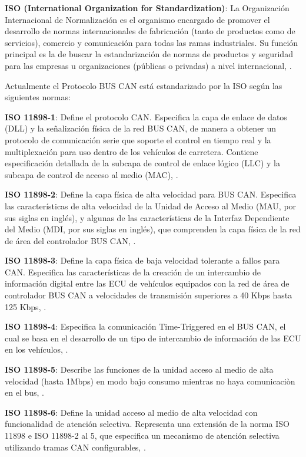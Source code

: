 \textbf{ISO (International Organization for Standardization)}:  La Organización Internacional de Normalización es el organismo encargado de promover el desarrollo de normas internacionales de fabricación (tanto de productos como de servicios), comercio y comunicación para todas las ramas industriales. Su función principal es la de buscar la estandarización de normas de productos y seguridad para las empresas u organizaciones (públicas o privadas) a nivel internacional, \cite{ISO}.

Actualmente el Protocolo BUS CAN está estandarizado por la ISO según las siguientes normas:

\textbf{ISO 11898-1}: Define el protocolo CAN. Especifica la capa de enlace de datos (DLL) y la señalización física de la red BUS CAN,  de manera a  obtener un protocolo de comunicación serie que soporte el control en tiempo real y la multiplexación para uso dentro de los vehículos de carretera. Contiene especificación detallada de la subcapa  de control de enlace lógico (LLC) y la subcapa de control de acceso al medio (MAC), \cite{ISO1}.

\textbf{ISO 11898-2}: Define la capa física de alta velocidad para BUS CAN. Especifica las características de alta velocidad de la Unidad de Acceso al Medio (MAU, por sus siglas en inglés), y algunas de las características de la Interfaz Dependiente del Medio (MDI, por sus siglas en inglés), que comprenden la capa física de la red de área del controlador BUS CAN, \cite{ISO2}.

\textbf{ISO 11898-3}: Define la capa física de baja velocidad tolerante a fallos para CAN. Especifica las características de la creación de un intercambio de información digital entre las ECU de vehículos equipados con la red de área de controlador BUS CAN a velocidades de transmisión superiores a 40 Kbps hasta 125 Kbps, \cite{ISO3}.

\textbf{ISO 11898-4}: Especifica la comunicación Time-Triggered en el BUS CAN, el cual se basa en el desarrollo de un tipo de intercambio de información de las ECU en los vehículos, \cite{ISO4}.

\textbf{ISO 11898-5}: Describe las funciones de la unidad acceso al medio de alta velocidad (hasta 1Mbps)  en modo bajo consumo mientras no haya comunicaciòn en el bus, \cite{ISO5}. 

\textbf{ISO 11898-6}: Define la unidad acceso al medio de alta velocidad con funcionalidad de atención selectiva.  Representa una extensión de la norma ISO 11898 e ISO 11898-2 al  5, que especifica un mecanismo de atención selectiva utilizando tramas CAN configurables, \cite{ISO6}.

